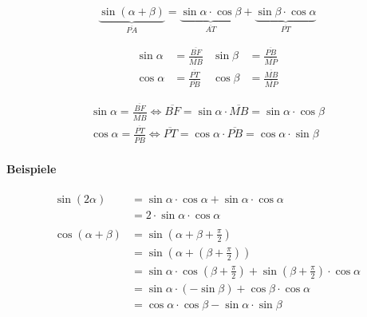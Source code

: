 \[
    \underbrace{\sin(\alpha + \beta)}_{\overline{PA}} =
    \underbrace{\sin \alpha \cdot \cos \beta}_{\overline{AT}} +
    \underbrace{\sin \beta \cdot \cos \alpha}_{\overline{PT}} 
\]

\begin{align*}
    \sin \alpha &= \frac{\overline{BF}}{\overline{MB}}
    &\sin \beta &= \frac{\overline{PB}}{\overline{MP}} \\
    \cos \alpha &= \frac{\overline{PT}}{\overline{PB}}
    &\cos \beta &= \frac{\overline{MB}}{\overline{MP}}
\end{align*}

\begin{align*}
    \sin \alpha = \frac{\overline{BF}}{\overline{MB}}
    \Leftrightarrow \overline{BF} = \sin \alpha \cdot \overline{MB} 
    = \sin \alpha \cdot \cos \beta \\
    \cos \alpha = \frac{\overline{PT}}{\overline{PB}} 
    \Leftrightarrow \overline{PT} = \cos \alpha \cdot \overline{PB}
    = \cos \alpha \cdot \sin \beta
\end{align*}

\paragraph{Beispiele}

\begin{align*}
    \sin(2 \alpha)
    &= \sin\alpha \cdot \cos\alpha + \sin\alpha \cdot \cos\alpha \\
    &= 2 \cdot \sin\alpha \cdot \cos\alpha \\
    \\
    \cos(\alpha + \beta)
    &= \sin\left(\alpha + \beta + \frac{\pi}{2}\right) \\
    &= \sin\left(\alpha + \left(\beta + \frac{\pi}{2}\right)\right) \\
    &= \sin\alpha \cdot \cos\left( \beta + \frac{\pi}{2} \right)
     + \sin\left( \beta + \frac{\pi}{2} \right) \cdot \cos\alpha \\
    &= \sin\alpha \cdot (-\sin\beta) + \cos\beta \cdot \cos\alpha \\
    &= \cos\alpha \cdot \cos\beta - \sin\alpha \cdot \sin\beta
\end{align*}

